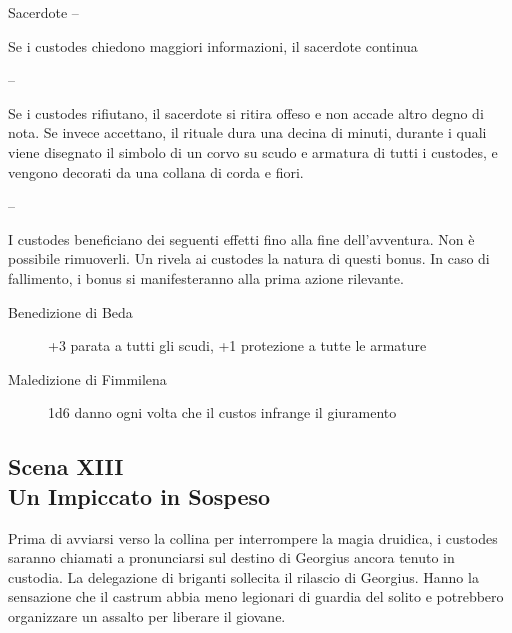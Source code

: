 \documentclass[11.5pt,twocolumn]{article}
\begin{document}
Sacerdote --

Se i custodes chiedono maggiori informazioni, il sacerdote continua

-- 

Se i custodes rifiutano, il sacerdote si ritira offeso e non accade altro degno di nota.
Se invece accettano, il rituale dura una decina di minuti, durante i quali viene disegnato il simbolo di un corvo su scudo e armatura di tutti i custodes, e vengono decorati da una collana di corda e fiori.

-- 

I custodes beneficiano dei seguenti effetti fino alla fine dell'avventura. Non \`{e} possibile rimuoverli.
Un  rivela ai custodes la natura di questi bonus.
In caso di fallimento, i bonus si manifesteranno alla prima azione rilevante.
\begin{description}
\item[Benedizione di Beda] +3 parata a tutti gli scudi, +1 protezione a tutte le armature
\item[Maledizione di Fimmilena] 1d6 danno ogni volta che il custos infrange il giuramento
\end{description}


\subsection*{Scena XIII\\Un Impiccato in Sospeso}
%

Prima di avviarsi verso la collina per interrompere la magia druidica, i custodes saranno chiamati a pronunciarsi sul destino di Georgius ancora tenuto in custodia.
La delegazione di briganti sollecita il rilascio di Georgius.
Hanno la sensazione che il castrum abbia meno legionari di guardia del solito e potrebbero organizzare un assalto per liberare il giovane.
\end{document}
